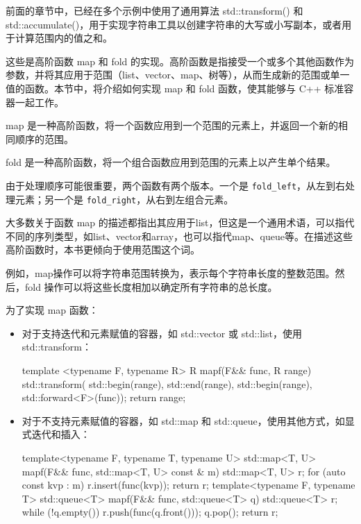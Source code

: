 前面的章节中，已经在多个示例中使用了通用算法 std::transform() 和 std::accumulate()，用于实现字符串工具以创建字符串的大写或小写副本，或者用于计算范围内的值之和。

这些是高阶函数 map 和 fold 的实现。高阶函数是指接受一个或多个其他函数作为参数，并将其应用于范围（list、vector、map、树等），从而生成新的范围或单一值的函数。本节中，将介绍如何实现 map 和 fold 函数，使其能够与 C++ 标准容器一起工作。


map 是一种高阶函数，将一个函数应用到一个范围的元素上，并返回一个新的相同顺序的范围。

fold 是一种高阶函数，将一个组合函数应用到范围的元素上以产生单个结果。

由于处理顺序可能很重要，两个函数有两个版本。一个是 \verb|fold_left|，从左到右处理元素；另一个是 \verb|fold_right|，从右到左组合元素。

\begin{myNotic}
大多数关于函数 map 的描述都指出其应用于list，但这是一个通用术语，可以指代不同的序列类型，如list、vector和array，也可以指代map、queue等。在描述这些高阶函数时，本书更倾向于使用范围这个词。
\end{myNotic}

例如，map操作可以将字符串范围转换为，表示每个字符串长度的整数范围。然后，fold 操作可以将这些长度相加以确定所有字符串的总长度。


为了实现 map 函数：

\begin{itemize}
\item
对于支持迭代和元素赋值的容器，如 std::vector 或 std::list，使用 std::transform：

\begin{cpp}
template <typename F, typename R>
R mapf(F&& func, R range)
{
    std::transform(
        std::begin(range), std::end(range), std::begin(range),
        std::forward<F>(func));
    return range;
}
\end{cpp}

\item
对于不支持元素赋值的容器，如 std::map 和 std::queue，使用其他方式，如显式迭代和插入：

\begin{cpp}
template<typename F, typename T, typename U>
std::map<T, U> mapf(F&& func, std::map<T, U> const & m)
{
    std::map<T, U> r;
    for (auto const kvp : m)
    r.insert(func(kvp));
    return r;
}
template<typename F, typename T>
std::queue<T> mapf(F&& func, std::queue<T> q)
{
    std::queue<T> r;
    while (!q.empty())
    {
        r.push(func(q.front()));
        q.pop();
    }
    return r;
}
\end{cpp}

\end{itemize}

